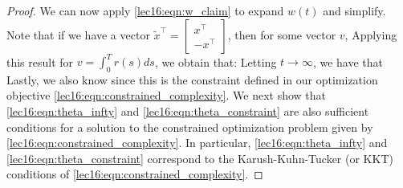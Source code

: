 \begin{proof}
We can now apply \eqref{lec16:eqn:w_claim} to expand \(w(t)\) and simplify. Note that if we have a vector \(\tilde{x}^\top = \begin{bmatrix} x^\top \\ -x^\top \end{bmatrix}\), then for some vector \(v\),
Applying this result for $v = \int_0^T r(s) ds$, we obtain that:
Letting $t \to \infty$, we have that
Lastly, we also know 
 since this is the constraint defined in our optimization objective \eqref{lec16:eqn:constrained_complexity}. We next show that \eqref{lec16:eqn:theta_infty} and \eqref{lec16:eqn:theta_constraint} are also sufficient conditions for a solution to the constrained optimization problem given by \eqref{lec16:eqn:constrained_complexity}. In particular, \eqref{lec16:eqn:theta_infty} and \eqref{lec16:eqn:theta_constraint} correspond to the Karush-Kuhn-Tucker (or KKT) conditions of \eqref{lec16:eqn:constrained_complexity}.


\end{proof}
